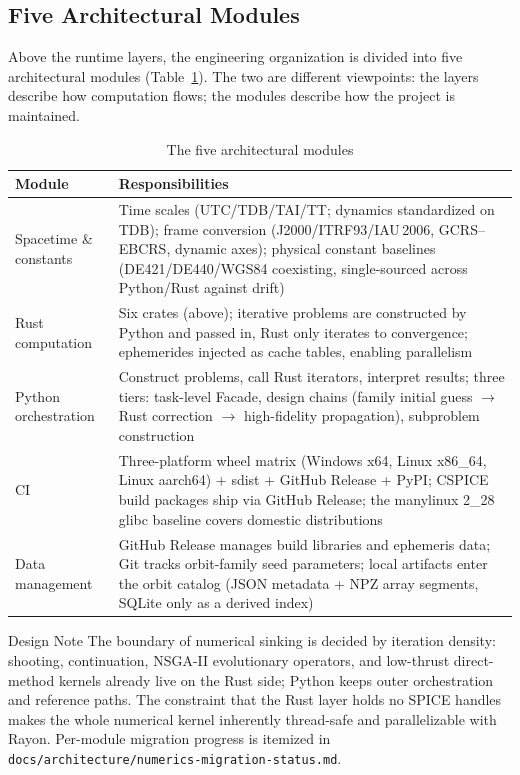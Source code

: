 \subsection{Five Architectural Modules}

Above the runtime layers, the engineering organization is divided into five
architectural modules (Table~\ref{tab:modules}). The two are different
viewpoints: the layers describe how computation flows; the modules describe
how the project is maintained.

\begin{table}[htbp]
\centering\small
\caption{The five architectural modules}
\label{tab:modules}
\begin{tabularx}{\textwidth}{@{}lX@{}}
\toprule
\textbf{Module} & \textbf{Responsibilities} \\
\midrule
Spacetime \& constants & Time scales (UTC/TDB/TAI/TT; dynamics standardized on
TDB); frame conversion (J2000/ITRF93/IAU\,2006, GCRS--EBCRS, dynamic axes);
physical constant baselines (DE421/DE440/WGS84 coexisting, single-sourced
across Python/Rust against drift) \\
Rust computation & Six crates (above); iterative problems are constructed by
Python and passed in, Rust only iterates to convergence; ephemerides injected
as cache tables, enabling parallelism \\
Python orchestration & Construct problems, call Rust iterators, interpret
results; three tiers: task-level Facade, design chains (family initial guess
$\to$ Rust correction $\to$ high-fidelity propagation), subproblem
construction \\
CI & Three-platform wheel matrix (Windows x64, Linux x86\_64, Linux aarch64)
+ sdist + GitHub Release + PyPI; CSPICE build packages ship via GitHub
Release; the manylinux 2\_28 glibc baseline covers domestic distributions \\
Data management & GitHub Release manages build libraries and ephemeris data;
Git tracks orbit-family seed parameters; local artifacts enter the orbit
catalog (JSON metadata + NPZ array segments, SQLite only as a derived index) \\
\bottomrule
\end{tabularx}
\end{table}

\begin{keybox}{Design Note}
The boundary of numerical sinking is decided by iteration density: shooting,
continuation, NSGA-II evolutionary operators, and low-thrust direct-method
kernels already live on the Rust side; Python keeps outer orchestration and
reference paths. The constraint that the Rust layer holds no SPICE handles
makes the whole numerical kernel inherently thread-safe and parallelizable
with Rayon. Per-module migration progress is itemized in
\texttt{docs/architecture/numerics-migration-status.md}.
\end{keybox}
